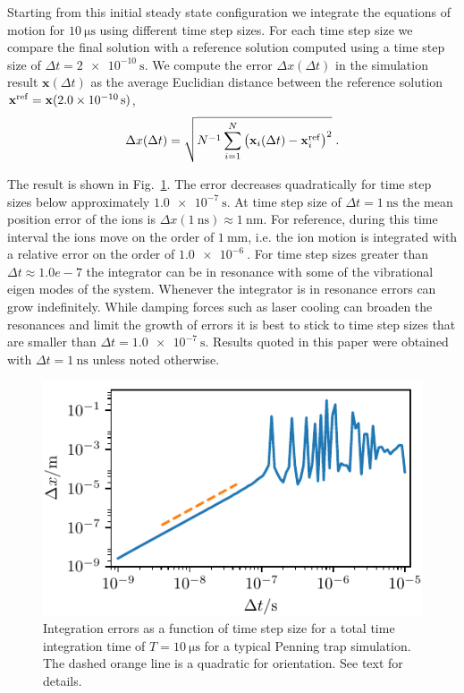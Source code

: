 \documentclass[aps, pra, preprint]{revtex4-1}
\begin{document}
Starting from this initial steady state configuration we
integrate the equations of motion for $\SI{10}{\us}$ using
different time step sizes. For each time step size we compare the
final solution with a reference solution computed using a time
step size of $\Delta t = \SI{2e-10}{\second}$. We compute the
error $\Delta x(\Delta t)$ in the simulation result
$\mathbf{x}(\Delta t)$ as the average Euclidian distance between
the reference solution $\mathbf{x}^{\rm
  ref}=\mathbf{x}(\SI{2.0e-10}{\second})$,
\begin{equation}
  \Delta x(\Delta t) =
  \sqrt{N^{-1}\sum_{i=1}^N\left(
      \mathbf{x}_i(\Delta t)-\mathbf{x}_i^{\rm ref}\right)^2}\;.
\end{equation}

The result is shown in Fig.~\ref{fig:convergence}. The error
decreases quadratically for time step sizes below approximately
$\SI{1.0e-7}{\second}$. At time step size of $\Delta t =
\SI{1}{\nano\second}$ the mean position error of the ions is
$\Delta x(\SI{1}{\nano\second})\approx \SI{1}{\nano\meter}$. For
reference, during this time interval the ions move on the order
of $\SI{1}{\milli\meter}$, i.e. the ion motion is integrated with
a relative error on the order of $\SI{1.0e-6}{}$. For time step
sizes greater than $\Delta t\approx 1.0e-7$ the integrator can be in
resonance with some of the vibrational eigen modes of the system.
Whenever the integrator is in resonance errors can grow
indefinitely. While damping forces such as laser cooling can
broaden the resonances and limit the growth of errors it is best
to stick to time step sizes that are smaller than $\Delta t =
\SI{1.0e-7}{\second}$. Results quoted in this paper were obtained
with $\Delta t = \SI{1}{\nano\second}$ unless noted otherwise.
\begin{figure}
  \includegraphics{./figures/fig_convergence.pdf}
  \caption{Integration errors as a function of time step size for
    a total time integration time of $T=\SI{10}{\us}$ for a
    typical Penning trap simulation. The dashed orange line is a
    quadratic for orientation. See text for details.}
  \label{fig:convergence}
\end{figure}
\end{document}
